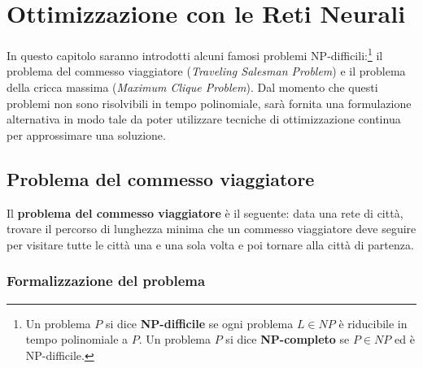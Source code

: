 
\chapter{Ottimizzazione con le Reti Neurali}
\label{cha:ottimizzazione_con_le_reti_neurali}
In questo capitolo saranno introdotti alcuni famosi problemi NP-difficili:\footnote{Un problema $P$ si dice \textbf{NP-difficile} se ogni problema $L \in NP$ è riducibile in tempo polinomiale a $P$. Un problema $P$ si dice \textbf{NP-completo} se $P \in NP$ ed è NP-difficile.} il problema del commesso viaggiatore (\emph{Traveling Salesman Problem}) e il problema della cricca massima (\emph{Maximum Clique Problem}). Dal momento che questi problemi non sono risolvibili in tempo polinomiale, sarà fornita una formulazione alternativa in modo tale da poter utilizzare tecniche di ottimizzazione continua per approssimare una soluzione.

\section{Problema del commesso viaggiatore}
\label{sec:problema_del_commesso_viaggiatore}

Il \textbf{problema del commesso viaggiatore} è il seguente: data una rete di città, trovare il percorso di lunghezza minima che un commesso viaggiatore deve seguire per visitare tutte le città una e una sola volta e poi tornare alla città di partenza.

\subsection{Formalizzazione del problema}

